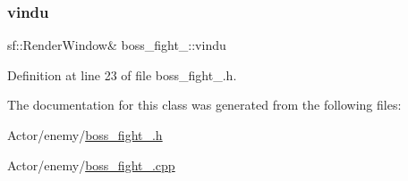 \subsubsection{\texorpdfstring{vindu}{vindu}}
{\footnotesize\ttfamily sf\+::\+Render\+Window\& boss\+\_\+fight\+\_\+::vindu}



Definition at line 23 of file boss\+\_\+fight\+\_.\+h.



The documentation for this class was generated from the following files\+:\begin{DoxyCompactItemize}
\item 
Actor/enemy/\hyperlink{boss__fight__1_8h}{boss\+\_\+fight\+\_.\+h}\item 
Actor/enemy/\hyperlink{boss__fight__1_8cpp}{boss\+\_\+fight\+\_.\+cpp}\end{DoxyCompactItemize}
